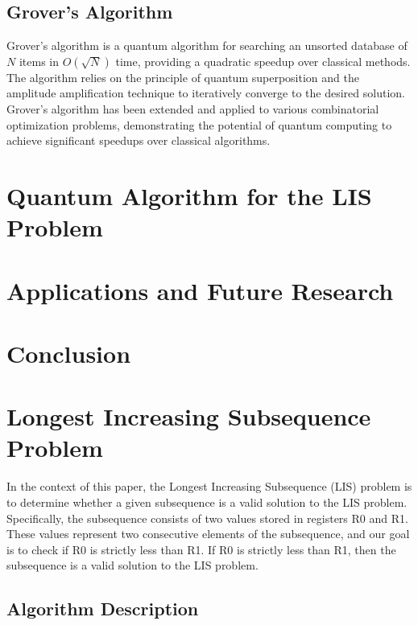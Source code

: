 \subsection{Grover's Algorithm}

Grover's algorithm \cite{grover} is a quantum algorithm for searching an unsorted database of $N$ items in $O(\sqrt{N})$ time, providing a quadratic speedup over classical methods. The algorithm relies on the principle of quantum superposition and the amplitude amplification technique to iteratively converge to the desired solution. Grover's algorithm has been extended and applied to various combinatorial optimization problems, demonstrating the potential of quantum computing to achieve significant speedups over classical algorithms.

\section{Quantum Algorithm for the LIS Problem}
\label{sec:algorithm}

\section{Applications and Future Research}
\label{sec:applications}

\section{Conclusion}
\label{sec:conclusion}





\section{Longest Increasing Subsequence Problem}

In the context of this paper, the Longest Increasing Subsequence (LIS) problem is to determine whether a given subsequence is a valid solution to the LIS problem. Specifically, the subsequence consists of two values stored in registers R0 and R1. These values represent two consecutive elements of the subsequence, and our goal is to check if R0 is strictly less than R1. If R0 is strictly less than R1, then the subsequence is a valid solution to the LIS problem.

\subsection{Algorithm Description}

